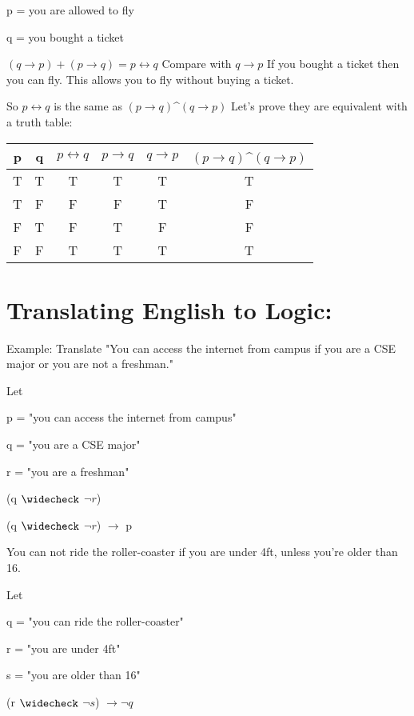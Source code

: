 \documentclass{article}
\begin{document}
p = you are allowed to fly

q = you bought a ticket

$(q\rightarrow p)+(p\rightarrow q) = p\leftrightarrow q$
\hfill \break
Compare with
$q\rightarrow p$
\hfill \break
If you bought a ticket then you can fly.
\hfill \break
This allows you to fly without buying a ticket.

\hfill \break
So $p\leftrightarrow q$ is the same as $(p\rightarrow q)$\textasciicircum$(q\rightarrow p)$
\hfill \break
Let's prove they are equivalent with a truth table:
\begin{center}
\begin{tabular}{ |c|c|c|c|c|c| } 
 \hline
 p & q & $p\leftrightarrow q$ & $p\rightarrow q$ & $q\rightarrow p$ & $(p\rightarrow q)$\textasciicircum$(q\rightarrow p)$ \\ 
 \hline
 T & T & T & T & T & T \\ 
 T & F & F & F & T & F \\
 F & T & F & T & F & F \\
 F & F & T & T & T & T \\
 \hline
\end{tabular}
\end{center}

\vspace{50mm}
\section{Translating English to Logic:}
\hfill \break
Example: Translate
\hfill \break
"You can access the internet from campus if you are a CSE major or you are not a freshman."

\hfill \break
Let

p = "you can access the internet from campus"

q = "you are a CSE major"

r = "you are a freshman"

(q $\widecheck$ $\neg r$)

(q $\widecheck$ $\neg r$) $\rightarrow$ p

\hfill \break
You can not ride the roller-coaster if you are under 4ft, unless you're older than 16.

Let

q = "you can ride the roller-coaster"

r = "you are under 4ft"

s = "you are older than 16"

\hfill \break
(r $\widecheck$ $\neg s$) $\rightarrow \neg q$
\end{document}
